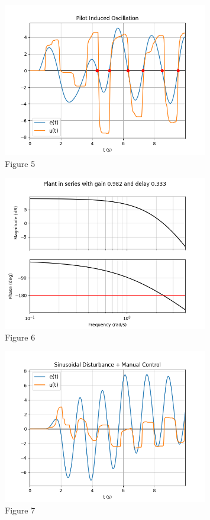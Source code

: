 \documentclass[8pt]{article}
\begin{document}
\begin{figure}
    \centering
    \includegraphics[width=0.8\textwidth]{figures/FIGURE_5.png}
    \caption{Figure 5}
    \label{fig:figure5}
\end{figure}

\newpage

\begin{figure}
    \centering
    \includegraphics[width=0.8\textwidth]{figures/FIGURE_6.png}
    \caption{Figure 6}
    \label{fig:figure6}
\end{figure}

\begin{figure}
    \centering
    \includegraphics[width=0.8\textwidth]{figures/FIGURE_7.png}
    \caption{Figure 7}
    \label{fig:figure7}
\end{figure}
\end{document}
